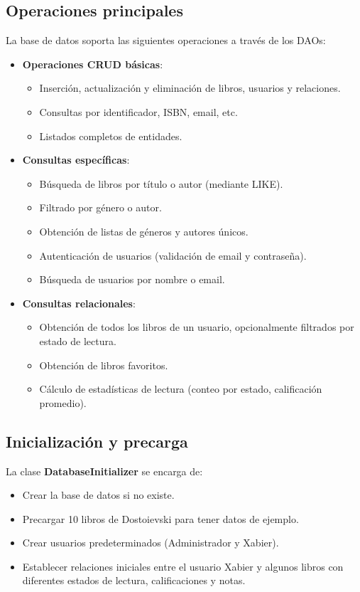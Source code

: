 \documentclass[a4paper,12pt]{report}
\begin{document}
      \subsection{Operaciones principales}
        La base de datos soporta las siguientes operaciones a través de los DAOs:
        \begin{itemize}
          \item \textbf{Operaciones CRUD básicas}:
            \begin{itemize}
              \item Inserción, actualización y eliminación de libros, usuarios y relaciones.
              \item Consultas por identificador, ISBN, email, etc.
              \item Listados completos de entidades.
            \end{itemize}
          \item \textbf{Consultas específicas}:
            \begin{itemize}
              \item Búsqueda de libros por título o autor (mediante LIKE).
              \item Filtrado por género o autor.
              \item Obtención de listas de géneros y autores únicos.
              \item Autenticación de usuarios (validación de email y contraseña).
              \item Búsqueda de usuarios por nombre o email.
            \end{itemize}
          \item \textbf{Consultas relacionales}:
            \begin{itemize}
              \item Obtención de todos los libros de un usuario, opcionalmente filtrados por estado de lectura.
              \item Obtención de libros favoritos.
              \item Cálculo de estadísticas de lectura (conteo por estado, calificación promedio).
            \end{itemize}
        \end{itemize}
      \subsection{Inicialización y precarga}
        La clase \textbf{DatabaseInitializer} se encarga de:
        \begin{itemize}
          \item Crear la base de datos si no existe.
          \item Precargar 10 libros de Dostoievski para tener datos de ejemplo.
          \item Crear usuarios predeterminados (Administrador y Xabier).
          \item Establecer relaciones iniciales entre el usuario Xabier y algunos libros con diferentes estados de lectura, calificaciones y notas.
        \end{itemize}
\end{document}
